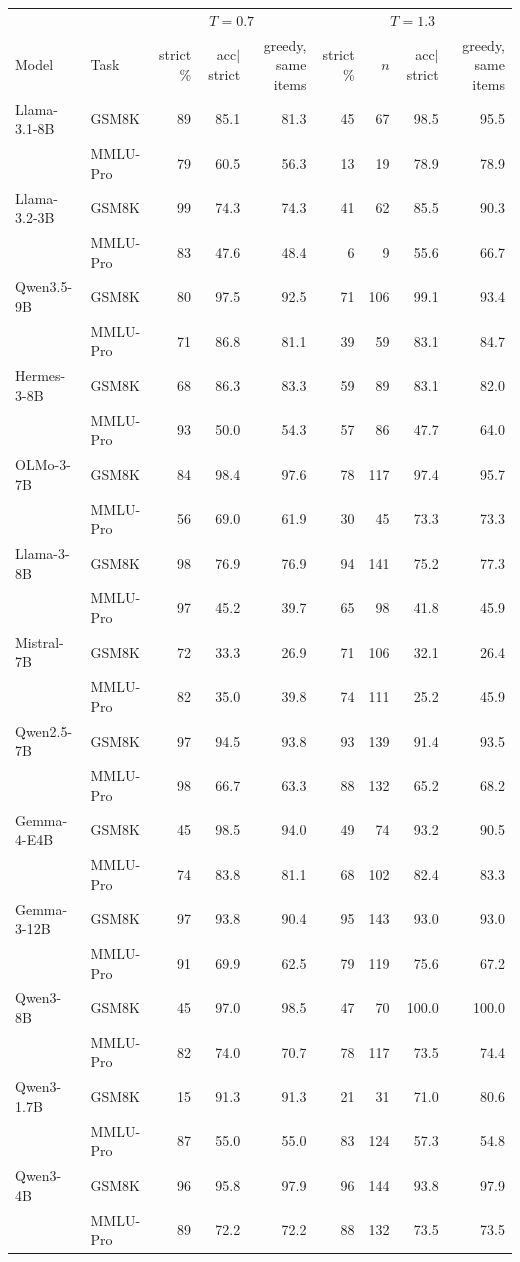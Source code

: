 \begin{tabular}{llrrrrrrr}
\toprule
 & & \multicolumn{3}{c}{$T{=}0.7$} & \multicolumn{4}{c}{$T{=}1.3$} \\
Model & Task & strict \% & acc$\mid$strict & greedy, same items & strict \% & $n$ & acc$\mid$strict & greedy, same items \\
\midrule
Llama-3.1-8B & GSM8K & 89 & 85.1 & 81.3 & 45 & 67 & 98.5 & 95.5 \\
 & MMLU-Pro & 79 & 60.5 & 56.3 & 13 & 19 & 78.9 & 78.9 \\
Llama-3.2-3B & GSM8K & 99 & 74.3 & 74.3 & 41 & 62 & 85.5 & 90.3 \\
 & MMLU-Pro & 83 & 47.6 & 48.4 & 6 & 9 & 55.6 & 66.7 \\
Qwen3.5-9B & GSM8K & 80 & 97.5 & 92.5 & 71 & 106 & 99.1 & 93.4 \\
 & MMLU-Pro & 71 & 86.8 & 81.1 & 39 & 59 & 83.1 & 84.7 \\
Hermes-3-8B & GSM8K & 68 & 86.3 & 83.3 & 59 & 89 & 83.1 & 82.0 \\
 & MMLU-Pro & 93 & 50.0 & 54.3 & 57 & 86 & 47.7 & 64.0 \\
OLMo-3-7B & GSM8K & 84 & 98.4 & 97.6 & 78 & 117 & 97.4 & 95.7 \\
 & MMLU-Pro & 56 & 69.0 & 61.9 & 30 & 45 & 73.3 & 73.3 \\
Llama-3-8B & GSM8K & 98 & 76.9 & 76.9 & 94 & 141 & 75.2 & 77.3 \\
 & MMLU-Pro & 97 & 45.2 & 39.7 & 65 & 98 & 41.8 & 45.9 \\
Mistral-7B & GSM8K & 72 & 33.3 & 26.9 & 71 & 106 & 32.1 & 26.4 \\
 & MMLU-Pro & 82 & 35.0 & 39.8 & 74 & 111 & 25.2 & 45.9 \\
Qwen2.5-7B & GSM8K & 97 & 94.5 & 93.8 & 93 & 139 & 91.4 & 93.5 \\
 & MMLU-Pro & 98 & 66.7 & 63.3 & 88 & 132 & 65.2 & 68.2 \\
Gemma-4-E4B & GSM8K & 45 & 98.5 & 94.0 & 49 & 74 & 93.2 & 90.5 \\
 & MMLU-Pro & 74 & 83.8 & 81.1 & 68 & 102 & 82.4 & 83.3 \\
Gemma-3-12B & GSM8K & 97 & 93.8 & 90.4 & 95 & 143 & 93.0 & 93.0 \\
 & MMLU-Pro & 91 & 69.9 & 62.5 & 79 & 119 & 75.6 & 67.2 \\
Qwen3-8B & GSM8K & 45 & 97.0 & 98.5 & 47 & 70 & 100.0 & 100.0 \\
 & MMLU-Pro & 82 & 74.0 & 70.7 & 78 & 117 & 73.5 & 74.4 \\
Qwen3-1.7B & GSM8K & 15 & 91.3 & 91.3 & 21 & 31 & 71.0 & 80.6 \\
 & MMLU-Pro & 87 & 55.0 & 55.0 & 83 & 124 & 57.3 & 54.8 \\
Qwen3-4B & GSM8K & 96 & 95.8 & 97.9 & 96 & 144 & 93.8 & 97.9 \\
 & MMLU-Pro & 89 & 72.2 & 72.2 & 88 & 132 & 73.5 & 73.5 \\
\bottomrule
\end{tabular}
